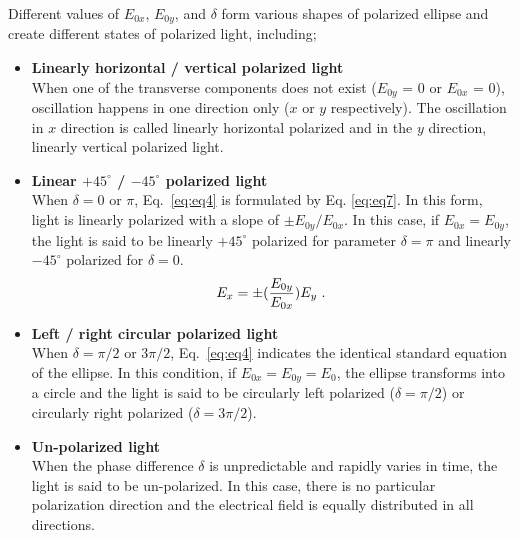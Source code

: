 \noindent Different values of $E_{0x}$, $E_{0y}$, and $\delta$ form various shapes of polarized ellipse and create different states of polarized light, including;

\begin{itemize}
	\item \textbf{Linearly horizontal / vertical polarized light}\\
	 When one of the transverse components does not exist ($E_{0y}$ = 0 or $E_{0x}$ = 0), oscillation happens in one direction only ($x$ or $y$ respectively).
	 The oscillation in $x$ direction is called linearly horizontal polarized and in the $y$ direction, linearly vertical polarized light.  
	\item \textbf{Linear $+45^{\circ}$ / $-45^{\circ}$ polarized light}\\
	 When $\delta = 0$ or $\pi$, Eq.~\ref{eq:eq4} is formulated by Eq. \ref{eq:eq7}.
	 In this form, light is linearly polarized with a slope of $\pm E_{0y} / E_{0x}$.
	 In this case, if $E_{0x} = E_{0y}$, the light is said to be linearly $+45^{\circ}$ polarized for parameter $\delta = \pi$ and linearly  $-45^{\circ}$ polarized for $\delta = 0$. 
	 \begin{equation}\label{eq:eq7}
	 \small
	 	E_{x} = \pm (\frac{E_{0y}}{E_{0x}})E_{y}~.
	 \end{equation}	 
	 \item \textbf{Left / right circular polarized light}\\
	When $\delta = \pi/2$ or $3\pi/2$, Eq.~\ref{eq:eq4} indicates the identical standard equation of the ellipse.
	In this condition, if $E_{0x} = E_{0y} = E_{0}$, the ellipse transforms into a circle and the light is said to be circularly left polarized ($\delta = \pi/2$) or circularly right polarized ($\delta = 3\pi/2$).
	\item \textbf{Un-polarized light}\\
	When the phase difference $\delta$ is unpredictable and rapidly varies in time, the light is said to be un-polarized.
	In this case, there is no particular polarization direction and the electrical field is equally distributed in all directions.
	 \end{itemize} 

